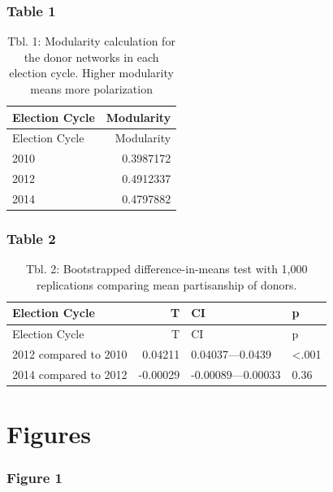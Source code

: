 \documentclass[12pt,]{article}
\begin{document}
\hypertarget{table-1}{%
\subsubsection{Table 1}\label{table-1}}

\begin{longtable}[]{@{}lr@{}}
\caption{Tbl. 1: Modularity calculation for the donor networks in each
election cycle. Higher modularity means more
polarization}\tabularnewline
\toprule
Election Cycle & Modularity\tabularnewline
\midrule
\endfirsthead
\toprule
Election Cycle & Modularity\tabularnewline
\midrule
\endhead
2010 & 0.3987172\tabularnewline
2012 & 0.4912337\tabularnewline
2014 & 0.4797882\tabularnewline
\bottomrule
\end{longtable}

\newpage

\hypertarget{table-2}{%
\subsubsection{Table 2}\label{table-2}}

\begin{longtable}[]{@{}lrll@{}}
\caption{Tbl. 2: Bootstrapped difference-in-means test with 1,000
replications comparing mean partisanship of donors.}\tabularnewline
\toprule
Election Cycle & T & CI & p\tabularnewline
\midrule
\endfirsthead
\toprule
Election Cycle & T & CI & p\tabularnewline
\midrule
\endhead
2012 compared to 2010 & 0.04211 & 0.04037---0.0439 &
\textless.001\tabularnewline
2014 compared to 2012 & -0.00029 & -0.00089---0.00033 &
0.36\tabularnewline
\bottomrule
\end{longtable}

\newpage

\hypertarget{figures}{%
\section{Figures}\label{figures}}

\hypertarget{figure-1}{%
\subsubsection{Figure 1}\label{figure-1}}
\end{document}
